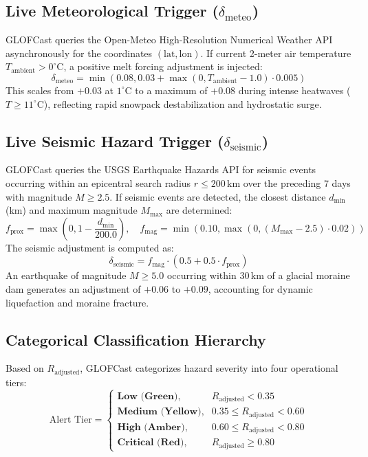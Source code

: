 \documentclass{mnnit}
\begin{document}
\subsection{Live Meteorological Trigger ($\delta_{\text{meteo}}$)}
GLOFCast queries the Open-Meteo High-Resolution Numerical Weather API asynchronously for the coordinates $(\text{lat}, \text{lon})$. If current 2-meter air temperature $T_{\text{ambient}} > 0^\circ\text{C}$, a positive melt forcing adjustment is injected:
\begin{equation}
    \delta_{\text{meteo}} = \min\left(0.08, 0.03 + \max\left(0, T_{\text{ambient}} - 1.0\right) \cdot 0.005\right)
\end{equation}
This scales from $+0.03$ at $1^\circ\text{C}$ to a maximum of $+0.08$ during intense heatwaves ($T \ge 11^\circ\text{C}$), reflecting rapid snowpack destabilization and hydrostatic surge.

\subsection{Live Seismic Hazard Trigger ($\delta_{\text{seismic}}$)}
GLOFCast queries the USGS Earthquake Hazards API for seismic events occurring within an epicentral search radius $r \le 200\,\text{km}$ over the preceding 7 days with magnitude $M \ge 2.5$. If seismic events are detected, the closest distance $d_{\min}$ (km) and maximum magnitude $M_{\max}$ are determined:
\begin{equation}
    f_{\text{prox}} = \max\left(0, 1 - \frac{d_{\min}}{200.0}\right), \quad f_{\text{mag}} = \min\left(0.10, \max\left(0, (M_{\max} - 2.5) \cdot 0.02\right)\right)
\end{equation}
The seismic adjustment is computed as:
\begin{equation}
    \delta_{\text{seismic}} = f_{\text{mag}} \cdot \left(0.5 + 0.5 \cdot f_{\text{prox}}\right)
\end{equation}
An earthquake of magnitude $M \ge 5.0$ occurring within 30\,km of a glacial moraine dam generates an adjustment of $+0.06$ to $+0.09$, accounting for dynamic liquefaction and moraine fracture.

\subsection{Categorical Classification Hierarchy}
Based on $R_{\text{adjusted}}$, GLOFCast categorizes hazard severity into four operational tiers:
\begin{equation}
    \text{Alert Tier} = \begin{cases}
        \textbf{Low (Green)}, & R_{\text{adjusted}} < 0.35 \\
        \textbf{Medium (Yellow)}, & 0.35 \le R_{\text{adjusted}} < 0.60 \\
        \textbf{High (Amber)}, & 0.60 \le R_{\text{adjusted}} < 0.80 \\
        \textbf{Critical (Red)}, & R_{\text{adjusted}} \ge 0.80
    \end{cases}
\end{equation}
\end{document}
